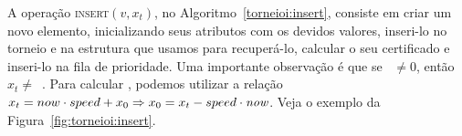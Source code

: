 %
%
%
%
%
%
%
%
%
%

A operação \textsc{insert}$(v, x_t)$, no Algoritmo~\ref{torneioi:insert}, consiste em criar um
novo elemento, inicializando seus atributos com os devidos valores, inseri-lo no torneio e na
estrutura que usamos para recuperá-lo, calcular o seu certificado e inseri-lo na fila de
prioridade.
Uma importante observação é que se \now~$\neq 0$, então $x_t \neq$~\initv.
Para calcular \initv, podemos utilizar a relação $x_t = now\cdot speed + x_0 \Rightarrow x_0 = x_t
- speed\cdot\textit{now}$.
Veja o exemplo da Figura~\ref{fig:torneioi:insert}.





